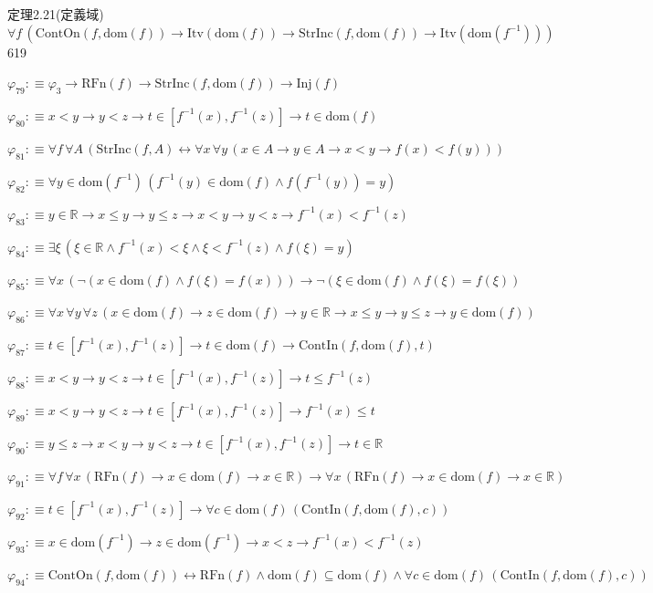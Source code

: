 \begin{fullproof}{定理2.21(定義域)}{$\forall f\,(\mathrm{ContOn}(f,\mathrm{dom}(f)) \to \mathrm{Itv}(\mathrm{dom}(f)) \to \mathrm{StrInc}(f,\mathrm{dom}(f)) \to \mathrm{Itv}(\mathrm{dom}(f^{-1})))$}{619}
\begin{abbrevlist}
\item $\varphi_{79} :\equiv \varphi_{3} \to \mathrm{RFn}(f) \to \mathrm{StrInc}(f,\mathrm{dom}(f)) \to \mathrm{Inj}(f)$
\item $\varphi_{80} :\equiv x < y \to y < z \to t \in [f^{-1}(x),f^{-1}(z)] \to t \in \mathrm{dom}(f)$
\item $\varphi_{81} :\equiv \forall f\,\forall A\,(\mathrm{StrInc}(f,A) \leftrightarrow \forall x\,\forall y\,(x \in A \to y \in A \to x < y \to f(x) < f(y)))$
\item $\varphi_{82} :\equiv \forall y \in \mathrm{dom}(f^{-1})\,(f^{-1}(y) \in \mathrm{dom}(f) \land f(f^{-1}(y)) = y)$
\item $\varphi_{83} :\equiv y \in \mathbb{R} \to x \leq y \to y \leq z \to x < y \to y < z \to f^{-1}(x) < f^{-1}(z)$
\item $\varphi_{84} :\equiv \exists \xi\,(\xi \in \mathbb{R} \land f^{-1}(x) < \xi \land \xi < f^{-1}(z) \land f(\xi) = y)$
\item $\varphi_{85} :\equiv \forall x\,(\neg (x \in \mathrm{dom}(f) \land f(\xi) = f(x))) \to \neg (\xi \in \mathrm{dom}(f) \land f(\xi) = f(\xi))$
\item $\varphi_{86} :\equiv \forall x\,\forall y\,\forall z\,(x \in \mathrm{dom}(f) \to z \in \mathrm{dom}(f) \to y \in \mathbb{R} \to x \leq y \to y \leq z \to y \in \mathrm{dom}(f))$
\item $\varphi_{87} :\equiv t \in [f^{-1}(x),f^{-1}(z)] \to t \in \mathrm{dom}(f) \to \mathrm{ContIn}(f,\mathrm{dom}(f),t)$
\item $\varphi_{88} :\equiv x < y \to y < z \to t \in [f^{-1}(x),f^{-1}(z)] \to t \leq f^{-1}(z)$
\item $\varphi_{89} :\equiv x < y \to y < z \to t \in [f^{-1}(x),f^{-1}(z)] \to f^{-1}(x) \leq t$
\item $\varphi_{90} :\equiv y \leq z \to x < y \to y < z \to t \in [f^{-1}(x),f^{-1}(z)] \to t \in \mathbb{R}$
\item $\varphi_{91} :\equiv \forall f\,\forall x\,(\mathrm{RFn}(f) \to x \in \mathrm{dom}(f) \to x \in \mathbb{R}) \to \forall x\,(\mathrm{RFn}(f) \to x \in \mathrm{dom}(f) \to x \in \mathbb{R})$
\item $\varphi_{92} :\equiv t \in [f^{-1}(x),f^{-1}(z)] \to \forall c \in \mathrm{dom}(f)\,(\mathrm{ContIn}(f,\mathrm{dom}(f),c))$
\item $\varphi_{93} :\equiv x \in \mathrm{dom}(f^{-1}) \to z \in \mathrm{dom}(f^{-1}) \to x < z \to f^{-1}(x) < f^{-1}(z)$
\item $\varphi_{94} :\equiv \mathrm{ContOn}(f,\mathrm{dom}(f)) \leftrightarrow \mathrm{RFn}(f) \land \mathrm{dom}(f) \subseteq \mathrm{dom}(f) \land \forall c \in \mathrm{dom}(f)\,(\mathrm{ContIn}(f,\mathrm{dom}(f),c))$

\end{abbrevlist}
\end{fullproof}
